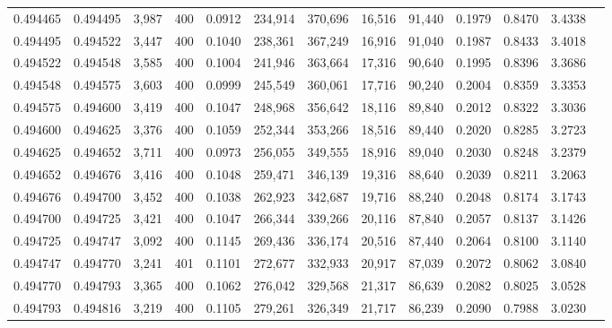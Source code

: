 \begin{tabular}{rrrrrrrrrrrrr}
0.494465 & 0.494495 &  3,987 & 400 &                                     0.0912 & 234,914 & 370,696 &  16,516 &  91,440 & 0.1979 & 0.8470 & 3.4338 \\
0.494495 & 0.494522 &  3,447 & 400 &                                     0.1040 & 238,361 & 367,249 &  16,916 &  91,040 & 0.1987 & 0.8433 & 3.4018 \\
0.494522 & 0.494548 &  3,585 & 400 &                                     0.1004 & 241,946 & 363,664 &  17,316 &  90,640 & 0.1995 & 0.8396 & 3.3686 \\
0.494548 & 0.494575 &  3,603 & 400 &                                     0.0999 & 245,549 & 360,061 &  17,716 &  90,240 & 0.2004 & 0.8359 & 3.3353 \\
0.494575 & 0.494600 &  3,419 & 400 &                                     0.1047 & 248,968 & 356,642 &  18,116 &  89,840 & 0.2012 & 0.8322 & 3.3036 \\
0.494600 & 0.494625 &  3,376 & 400 &                                     0.1059 & 252,344 & 353,266 &  18,516 &  89,440 & 0.2020 & 0.8285 & 3.2723 \\
0.494625 & 0.494652 &  3,711 & 400 &                                     0.0973 & 256,055 & 349,555 &  18,916 &  89,040 & 0.2030 & 0.8248 & 3.2379 \\
0.494652 & 0.494676 &  3,416 & 400 &                                     0.1048 & 259,471 & 346,139 &  19,316 &  88,640 & 0.2039 & 0.8211 & 3.2063 \\
0.494676 & 0.494700 &  3,452 & 400 &                                     0.1038 & 262,923 & 342,687 &  19,716 &  88,240 & 0.2048 & 0.8174 & 3.1743 \\
0.494700 & 0.494725 &  3,421 & 400 &                                     0.1047 & 266,344 & 339,266 &  20,116 &  87,840 & 0.2057 & 0.8137 & 3.1426 \\
0.494725 & 0.494747 &  3,092 & 400 &                                     0.1145 & 269,436 & 336,174 &  20,516 &  87,440 & 0.2064 & 0.8100 & 3.1140 \\
0.494747 & 0.494770 &  3,241 & 401 &                                     0.1101 & 272,677 & 332,933 &  20,917 &  87,039 & 0.2072 & 0.8062 & 3.0840 \\
0.494770 & 0.494793 &  3,365 & 400 &                                     0.1062 & 276,042 & 329,568 &  21,317 &  86,639 & 0.2082 & 0.8025 & 3.0528 \\
0.494793 & 0.494816 &  3,219 & 400 &                                     0.1105 & 279,261 & 326,349 &  21,717 &  86,239 & 0.2090 & 0.7988 & 3.0230 \\

\end{tabular}
